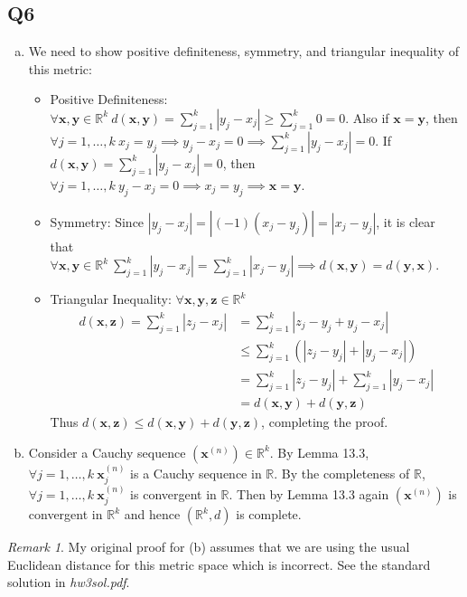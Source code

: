 \documentclass[12pt,lettersize]{article}
\newcommand{\R}{\mathbb{R}}
\theoremstyle{remark}
\newtheorem*{rem}{Remark}
\begin{document}
	\subsection*{Q6}
	\begin{enumerate}[(a)]
		\item We need to show positive definiteness, symmetry, and triangular inequality of this metric:
		\begin{itemize}
			\item Positive Definiteness: $\forall \mathbf{x,y}\in\R^k\ d(\mathbf{x},\mathbf{y})=\sum_{j=1}^{k}|y_j-x_j|\geq\sum_{j=1}^{k}0=0$. Also if $\mathbf{x}=\mathbf{y}$, then $\forall j=1,\dots,k\ x_j=y_j\implies y_j-x_j=0\implies\sum_{j=1}^{k}|y_j-x_j|=0$. If $d(\mathbf{x},\mathbf{y})=\sum_{j=1}^{k}|y_j-x_j|=0$, then $\forall j=1,\dots,k\ y_j-x_j=0\implies x_j=y_j\implies \mathbf{x}=\mathbf{y}$.
			\item Symmetry: Since $|y_j-x_j|=|(-1)(x_j-y_j)|=|x_j-y_j|$, it is clear that $\forall \mathbf{x,y}\in\R^k\ \sum_{j=1}^{k}|y_j-x_j|=\sum_{j=1}^{k}|x_j-y_j|\implies d(\mathbf{x},\mathbf{y})=d(\mathbf{y},\mathbf{x})$.
			\item Triangular Inequality: $\forall \mathbf{x,y,z}\in\R^k$
			\begin{align*}
				d(\mathbf{x,z})=\sum_{j=1}^{k}|z_j-x_j| &= \sum_{j=1}^{k}|z_j-y_j+y_j-x_j|\\
														&\leq \sum_{j=1}^{k}(|z_j-y_j|+|y_j-x_j|)\\
														&= \sum_{j=1}^{k}|z_j-y_j|+\sum_{j=1}^{k}|y_j-x_j|\\
														&= d(\mathbf{x,y})+d(\mathbf{y,z})
			\end{align*}
			Thus $d(\mathbf{x,z})\leq d(\mathbf{x,y})+d(\mathbf{y,z})$, completing the proof.
		\end{itemize}
		\item Consider a Cauchy sequence $(\mathbf{x}^{(n)})\in\R^k$. By Lemma 13.3, $\forall j=1,\dots,k\ \mathbf{x}^{(n)}_j$ is a Cauchy sequence in $\R$. By the completeness of $\R$, $\forall j=1,\dots,k\ \mathbf{x}^{(n)}_j$ is convergent in $\R$. Then by Lemma 13.3 again $(\mathbf{x}^{(n)})$ is convergent in $\R^k$ and hence $(\R^k,d)$ is complete.
	\end{enumerate}\bigskip
	\begin{rem}
		My original proof for (b) assumes that we are using the usual Euclidean distance for this metric space which is incorrect. See the standard solution in \emph{hw3sol.pdf}.
	\end{rem}
	\newpage
	
\end{document}
